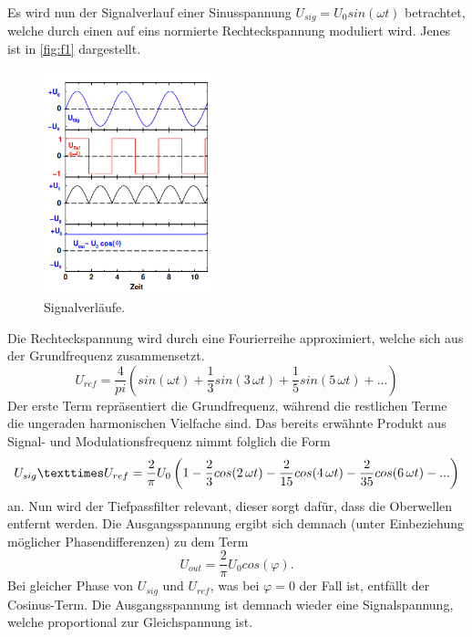 Es wird nun der Signalverlauf einer Sinusspannung $U_{sig} = U_0 sin (\omega t)$
betrachtet, welche durch einen auf eins normierte Rechteckspannung moduliert 
wird. Jenes ist in \autoref{fig:f1} dargestellt.
\begin{figure}[H]
    \centering
        \centering
        \includegraphics[width=0.45\textwidth]{Bilder/sigs.png}
        \caption{Signalverläufe. \cite{anleitung2}}
    \hfill
    \label{fig:f1}
\end{figure}
\noindent Die Rechteckspannung wird durch eine Fourierreihe approximiert, welche
sich aus der Grundfrequenz zusammensetzt.
\begin{equation}
    U_{ref} = \frac{4}{pi} \left(sin(\omega t) + \frac{1}{3}sin(3 \, \omega t) + \frac{1}{5}sin(5 \, \omega t) + ...\right)
\end{equation}
Der erste Term repräsentiert die Grundfrequenz, während die restlichen Terme 
die ungeraden harmonischen Vielfache sind. Das bereits erwähnte Produkt aus 
Signal- und Modulationsfrequenz nimmt folglich die Form
\begin{equation}
    U_{sig} \texttimes U_{ref} = \frac{2}{\pi} U_0 \left(1- \frac{2}{3}cos(2 \, \omega t) - \frac{2}{15}cos(4 \, \omega t) - \frac{2}{35}cos(6 \, \omega t) - ...\right)
\end{equation}
an. Nun wird der Tiefpassfilter relevant, dieser sorgt dafür, dass die Oberwellen 
entfernt werden. Die Ausgangsspannung ergibt sich demnach (unter Einbeziehung 
möglicher Phasendifferenzen) zu dem Term
\begin{equation}
    U_{out} = \frac{2}{\pi} U_0 cos(\varphi).
\end{equation}
Bei gleicher Phase von $U_{sig}$ und $U_{ref}$, was bei $\varphi = 0$ der Fall
ist, entfällt der Cosinus-Term. Die Ausgangsspannung ist demnach wieder eine 
Signalspannung, welche proportional zur Gleichspannung ist.


